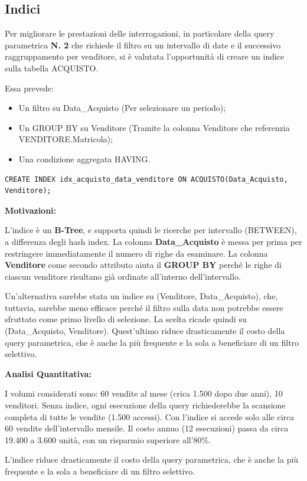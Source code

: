 \vspace{0.5cm}
\subsection{Indici}
Per migliorare le prestazioni delle interrogazioni, in particolare della query parametrica \textbf{N. 2} che richiede il filtro su un intervallo di date e il successivo raggruppamento per venditore, si è valutata l'opportunità di creare un indice sulla tabella ACQUISTO.

Essa prevede:
\begin{itemize}
    \item Un filtro su Data\_Acquisto (Per selezionare un periodo);
    \item Un GROUP BY su Venditore (Tramite la colonna Venditore che referenzia VENDITORE.Matricola);
    \item Una condizione aggregata HAVING.
\end{itemize}

\vspace{0.5cm}
\begin{lstlisting}[framesep=10pt]
CREATE INDEX idx_acquisto_data_venditore ON ACQUISTO(Data_Acquisto, Venditore);
\end{lstlisting}

\vspace{1cm}
\textbf{Motivazioni:}

L'indice è un \textbf{B-Tree}, e supporta quindi le ricerche per intervallo (BETWEEN), a differenza degli hash index.
La colonna \textbf{Data\_Acquisto} è messa per prima per restringere immediatamente il numero di righe da esaminare.
La colonna \textbf{Venditore} come secondo attributo aiuta il \textbf{GROUP BY} perché le righe di ciascun venditore risultano già ordinate all'interno dell'intervallo.

Un'alternativa sarebbe stata un indice su (Venditore, Data\_Acquisto), che, tuttavia, sarebbe meno efficace perché il filtro sulla data non potrebbe essere sfruttato come primo livello di selezione. La scelta ricade quindi su (Data\_Acquisto, Venditore).
\newline Quest'ultimo riduce drasticamente il costo della query parametrica, che è anche la più frequente e la sola a beneficiare di un filtro selettivo.

\vspace{0.5cm}
\textbf{Analisi Quantitativa:}

I volumi considerati sono: 60 vendite al mese (crica 1.500 dopo due anni), 10 venditori. Senza indice, ogni esecuzione della query richiederebbe la scansione completa di tutte le vendite (1.500 accessi). Con l'indice si accede solo alle circa 60 vendite dell'intervallo mensile. Il costo annuo (12 esecuzioni) passa da circa 19.400 a 3.600 unità, con un risparmio superiore all’80\%.

L'indice riduce drasticamente il costo della query parametrica, che è anche la più frequente e la sola a beneficiare di un filtro selettivo.